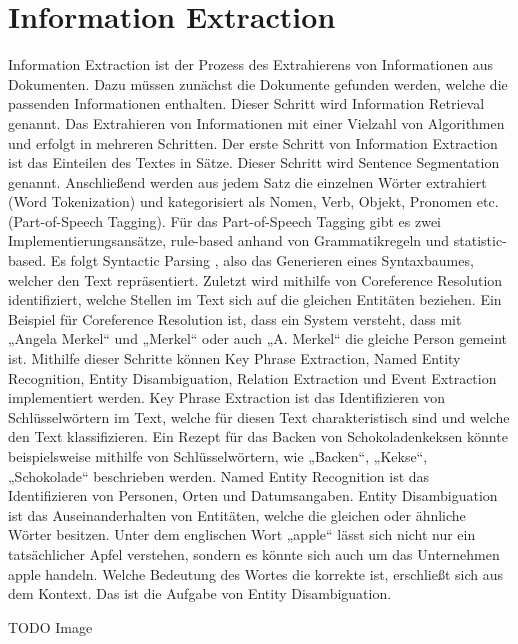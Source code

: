 \section{Information Extraction}
Information Extraction ist der Prozess des Extrahierens von Informationen aus Dokumenten. Dazu müssen zunächst die Dokumente gefunden werden, welche die passenden Informationen enthalten. Dieser Schritt wird Information Retrieval genannt. Das Extrahieren von Informationen mit einer Vielzahl von Algorithmen und erfolgt in mehreren Schritten.
Der erste Schritt von Information Extraction ist das Einteilen des Textes in Sätze. Dieser Schritt wird Sentence Segmentation genannt. Anschließend werden aus jedem Satz die einzelnen Wörter extrahiert (Word Tokenization) und kategorisiert als Nomen, Verb, Objekt, Pronomen etc. (Part-of-Speech Tagging). Für das Part-of-Speech Tagging gibt es zwei Implementierungsansätze, rule-based anhand von Grammatikregeln und statistic-based. Es folgt Syntactic Parsing , also das Generieren eines Syntaxbaumes, welcher den Text repräsentiert. Zuletzt wird mithilfe von Coreference Resolution identifiziert, welche Stellen im Text sich auf die gleichen Entitäten beziehen. Ein Beispiel für Coreference Resolution ist, dass ein System versteht, dass mit „Angela Merkel“ und „Merkel“ oder auch „A. Merkel“ die gleiche Person gemeint ist.
Mithilfe dieser Schritte können Key Phrase Extraction, Named Entity Recognition, Entity Disambiguation, Relation Extraction und Event Extraction implementiert werden. Key Phrase Extraction ist das Identifizieren von Schlüsselwörtern im Text, welche für diesen Text charakteristisch sind und welche den Text klassifizieren. Ein Rezept für das Backen von Schokoladenkeksen könnte beispielsweise mithilfe von Schlüsselwörtern, wie „Backen“, „Kekse“, „Schokolade“ beschrieben werden. Named Entity Recognition ist das Identifizieren von Personen, Orten und Datumsangaben. Entity Disambiguation ist das Auseinanderhalten von Entitäten, welche die gleichen oder ähnliche Wörter besitzen. Unter dem englischen Wort „apple“ lässt sich nicht nur ein tatsächlicher Apfel verstehen, sondern es könnte sich auch um das Unternehmen apple handeln. Welche Bedeutung des Wortes die korrekte ist, erschließt sich aus dem Kontext. Das ist die Aufgabe von Entity Disambiguation.

TODO Image

